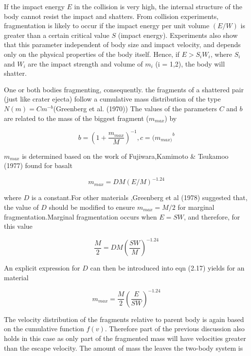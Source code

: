  If the impact energy $E$ in the collision is very high, the internal structure of the body cannot resist the impact and shatters. From collision experiments, fragmentation is likely to occur if the impact energy per unit volume $(E/W)$ is greater than a certain critical value $S$ (impact energy). Experiments also show  that this parameter independent of body size and impact velocity, and depends only on the physical properties of the body itself. Hence, if $E>S_{i}W_{i}$, where $S_{i}$ and $W_{i}$ are the impact strength and volume of $m_{i}$ (i = 1,2), the body will shatter. 
 
One or both bodies fragmenting, consequently. 
the fragments of a shattered pair (just like crater ejecta) follow a cumulative mass distribution of the type $N(m) = Cm^{-b}$(Greenberg et al. (1970)) The values of the parameters $C$ and $b$ are related to the mass of the biggest fragment ($m_{max}$) by

\begin{equation}
b = {(1+\frac {m_{max}}{M})}^{-1},
c = {(m_{max)}}^{b}
\end{equation}

$m_{max}$ is determined based on the work of Fujiwara,Kamimoto \& Tsukamoo (1977) found for basalt

\begin{equation}
m_{max} = {DM(E/M)}^{-1.24}
\end{equation}

where $D$ is a constant.For other materials ,Greenberg et al (1978) suggested that, the value of $D$ should be modified to ensure $m_{max} = M/2$ for marginal fragmentation.Marginal fragmentation occurs when $E = SW$, and therefore, for this value

\begin{equation}
\frac{M}{2} = DM{(\frac{SW}{M})}^{-1.24}
\end{equation}

An explicit expression for $D$ can then be introduced into eqn (2.17) yields for an material

\begin{equation}
m_{max} = \frac{M}{2}{(\frac{E}{SW})}^{-1.24}
\end{equation}

The velocity distribution of the fragments relative to parent body is again based on the cumulative function $f(v)$. Therefore part of the previous discussion also holds in this case as only part of the fragmented mass will have velocities greater than the escape velocity. The amount of mass the leaves the two-body system is

